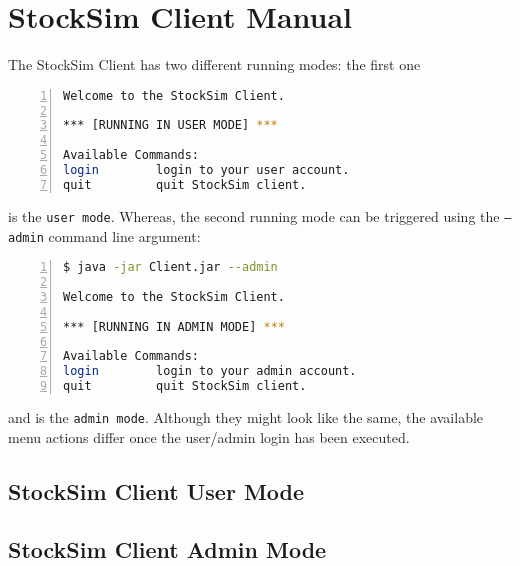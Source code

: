 \chapter{StockSim Client Manual}
The StockSim Client has two different running modes: the first one
\begin{lstlisting}[basicstyle=\footnotesize,language=bash,numbers=left,
numberstyle=\footnotesize,numbersep=8pt,frame=single]
Welcome to the StockSim Client.

*** [RUNNING IN USER MODE] ***

Available Commands:
login        login to your user account.             
quit         quit StockSim client.
\end{lstlisting}
is the \texttt{user mode}. Whereas, the second running mode can be triggered 
using the \texttt{--admin} command line argument:
\begin{lstlisting}[basicstyle=\footnotesize,language=bash,numbers=left,
numberstyle=\footnotesize,numbersep=8pt,frame=single]
$ java -jar Client.jar --admin

Welcome to the StockSim Client.

*** [RUNNING IN ADMIN MODE] ***

Available Commands:
login        login to your admin account.            
quit         quit StockSim client.
\end{lstlisting}
and is the \texttt{admin mode}. Although they might look like the same, the 
available menu actions differ once the user/admin login has been executed.

\section{StockSim Client User Mode}

\section{StockSim Client Admin Mode}
